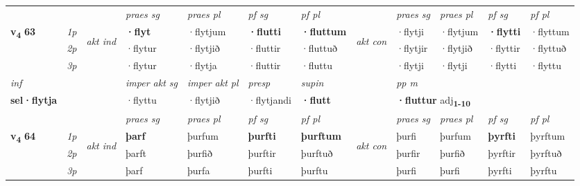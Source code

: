 \begin{longtable}[l]{X>{\footnotesize\itshape}llXXXXlXXXX}
 & &   & \textit{praes sg}  & \textit{praes pl}    & \textit{ pf sg} & \textit{pf pl} & & \textit{praes sg}  & \textit{praes pl}    & \textit{pf sg} & \textit{pf pl }  \\ \cmidrule{4-7} \cmidrule{9-12}
 \multirow{2}{*}{{{\textbf{v{\textsubscript{4}}} \Large{\textbf{63}}}}}  & 1p & \multirow{3}{*}{\begin{turn}{90}\textit{akt ind}\end{turn}} & \textbf{·flyt} & ·flytjum & \textbf{·flutti} & \textbf{·fluttum} & \multirow{3}{*}{\begin{turn}{90}\textit{akt con}\end{turn}} &·flytji & ·flytjum & \textbf{·flytti} & ·flyttum\\*
 & 2p &  &  ·flytur  & ·flytjið & ·fluttir & ·fluttuð & & ·flytjir & ·flytjið & ·flyttir & ·flyttuð \\*
 & 3p &  & ·flytur & ·flytja & ·fluttir & ·fluttu & & ·flytji & ·flytji& ·flytti & ·flyttu \\*
\cmidrule{4-7} \cmidrule{9-12}

   {\textit{inf}} & &  & \textit{imper akt sg} & \textit{imper akt pl}   & \textit{presp} & \textit{supin}  && \textit{pp m} \\*
  {\textbf{sel\allowbreak ·flytja}} & && ·flyttu  & ·flytjið   & ·flytjandi &  \textbf{·flutt}  && \multicolumn{2}{l}{\textbf{·fluttur} adj\textbf{\textsubscript{1-10}}} \\*

\midrule

 & &   & \textit{praes sg}  & \textit{praes pl}    & \textit{ pf sg} & \textit{pf pl} & & \textit{praes sg}  & \textit{praes pl}    & \textit{pf sg} & \textit{pf pl }  \\ \cmidrule{4-7} \cmidrule{9-12}
 \multirow{2}{*}{{{\textbf{v{\textsubscript{4}}} \Large{\textbf{64}}}}}  & 1p & \multirow{3}{*}{\begin{turn}{90}\textit{akt ind}\end{turn}} & \textbf{þarf} & þurfum & \textbf{þurfti} & \textbf{þurftum} & \multirow{3}{*}{\begin{turn}{90}\textit{akt con}\end{turn}} &þurfi & þurfum & \textbf{þyrfti} & þyrftum\\*
 & 2p &  &  þarft  & þurfið & þurftir & þurftuð & & þurfir & þurfið & þyrftir & þyrftuð \\*
 & 3p &  & þarf & þurfa & þurfti & þurftu & & þurfi & þurfi& þyrfti & þyrftu \\*
\cmidrule{4-7} \cmidrule{9-12}


\end{longtable}
